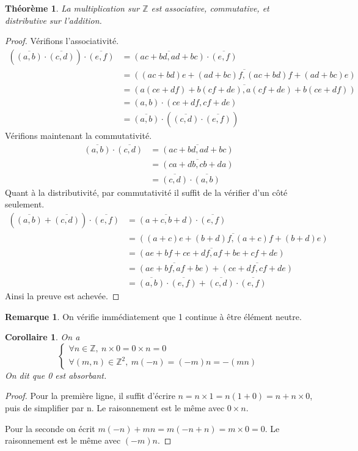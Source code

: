 \documentclass[french]{book}
\newcommand{\Z}{\mathbb{Z}}
\theoremstyle{plain}
\newtheorem{thm}{Théorème}[chapter]
\newtheorem{cor}{Corollaire}[chapter]
\theoremstyle{definition}
\newtheorem{rmq}{Remarque}[chapter]
\theoremstyle{remark}
\begin{document}
\begin{thm}
	La multiplication sur $\Z$ est associative, commutative, et distributive sur l'addition.
\end{thm}
\begin{proof}
	Vérifions l'associativité.
\begin{align*}
	\left(\overline{(a,b)}\cdot\overline{(c,d)}\right)\cdot\overline{(e,f)}&=\overline{(ac+bd,ad+bc)}\cdot\overline{(e,f)}\\
	&=\overline{((ac+bd)e+(ad+bc)f,(ac+bd)f+(ad+bc)e)}\\
	&=\overline{(a(ce+df)+b(cf+de),a(cf+de)+b(ce+df))}\\
	&=(a,b)\cdot(ce+df,cf+de)\\
	&=\overline{(a,b)}\cdot\left(\overline{(c,d)}\cdot\overline{(e,f)}\right)
\end{align*}
Vérifions maintenant la commutativité.
\begin{align*}
	\overline{(a,b)}\cdot\overline{(c,d)}&=\overline{(ac+bd,ad+bc)}\\
	&=\overline{(ca+db,cb+da)}\\
	&=\overline{(c,d)}\cdot\overline{(a,b)}
\end{align*}
Quant à la distributivité, par commutativité il suffit de la vérifier d'un côté seulement.
\begin{align*}
	\left(\overline{(a,b)}+\overline{(c,d)}\right)\cdot\overline{(e,f)}&=\overline{(a+c,b+d)}\cdot\overline{(e,f)}\\
	&=\overline{((a+c)e+(b+d)f,(a+c)f+(b+d)e)}\\
	&=\overline{(ae+bf+ce+df,af+be+cf+de)}\\
	&=\overline{(ae+bf,af+be)}+\overline{(ce+df,cf+de)}\\
	&=\overline{(a,b)}\cdot\overline{(e,f)}+\overline{(c,d)}\cdot\overline{(e,f)}
\end{align*}
Ainsi la preuve est achevée.
\end{proof}
\begin{rmq}
	On vérifie immédiatement que 1 continue à être élément neutre.
\end{rmq}
\begin{cor}
	On a 
$$\begin{cases}
	\forall n\in\mathbb{Z},\ n\times0=0\times n=0\\
	\forall(m,n)\in\mathbb{Z}^{2},\ m(-n)=(-m)n=-(mn)
\end{cases}$$
On dit que 0 est absorbant.
\end{cor}
\begin{proof}
	Pour la première ligne, il suffit d'écrire $n=n\times1=n(1+0)=n+n\times0$, puis de simplifier par n. Le raisonnement est le même avec $0\times n$. \par 
Pour la seconde on écrit $m(-n)+mn=m(-n+n)=m\times0=0.$ Le raisonnement est le même avec $(-m)n$.
\end{proof}
\end{document}
